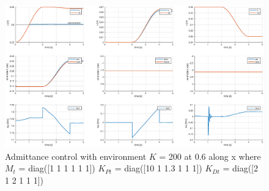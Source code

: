 \documentclass[a4paper,12pt]{article}
\begin{document}
\begin{figure}[H]
    \begin{center}
        \hspace*{-4.5cm}
        \includegraphics[scale=0.5]{images/admittance_stiff.eps}
    \end{center}
    \caption{Admittance control with environment $K$ = 200 at 0.6 along x where $M_t$ = diag([1 1 1 1 1 1]) $K_{Pt}$ = diag([10 1 1.3 1 1 1]) $K_{Dt}$ = diag([2 1 2 1 1 1])}
    \label{fig:admittance_stiff}
\end{figure}

\newpage
\end{document}
